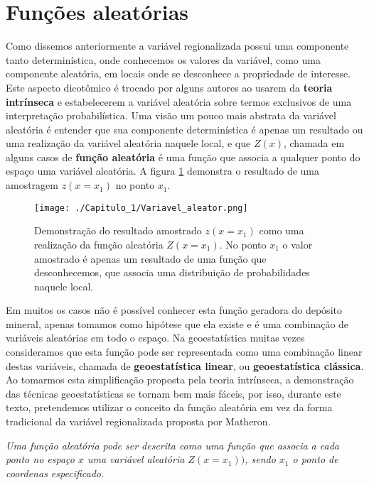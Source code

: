\section{Funções aleatórias} 

Como dissemos anteriormente a variável regionalizada possui uma componente tanto determinística, onde conhecemos os valores da variável, como uma componente aleatória, em locais onde se desconhece a propriedade de interesse. Este aspecto dicotômico é trocado por alguns autores ao usarem da \textbf{teoria intrínseca} e estabelecerem a variável aleatória sobre termos exclusivos de uma interpretação probabilística.  Uma visão um pouco mais abstrata da variável aleatória é entender que sua componente determinística é apenas um resultado ou uma realização da variável aleatória naquele local, e que  $Z(x)$, chamada em alguns casos de \textbf{função aleatória} é uma função que associa a qualquer ponto do espaço uma variável aleatória.  A figura \ref{func_aleatoridade} demonstra o resultado de uma amostragem $z(x= x_{1})$ no ponto $x_{1}$.  


\FloatBarrier
\begin{figure}[!htb]
	\centering
	\texttt{[image: ./Capitulo\_1/Variavel\_aleator.png]}	
	\caption{Demonstração do resultado amostrado $z(x = x_{1})$ como uma realização da função aleatória $Z(x = x_{1})$. No ponto $x_{1}$ o valor amostrado é apenas um resultado de uma função que desconhecemos, que associa uma distribuição de probabilidades naquele local. }
	\label{func_aleatoridade}
\end{figure}
\FloatBarrier

Em muitos os casos não é possível conhecer esta função geradora do depósito mineral, apenas tomamos como hipótese que ela existe e é uma combinação de variáveis aleatórias em todo o espaço. Na geoestatística muitas vezes consideramos que esta função pode ser representada como uma combinação linear destas variáveis, chamada de \textbf{geoestatística linear}, ou \textbf{geoestatística clássica}. Ao tomarmos esta simplificação proposta pela teoria intrínseca, a demonstração das técnicas geoestatísticas se tornam bem mais fáceis, por isso, durante este texto, pretendemos utilizar o conceito da função aleatória em vez da forma tradicional da variável regionalizada proposta por Matheron. 

\begin{definition}
	\textit{Uma função aleatória pode ser descrita como uma função que associa a cada ponto no espaço $x$ uma variável aleatória $Z(x =x_{1}))$, sendo $x_{1}$  o ponto de coordenas especificado. }
\end{definition}

